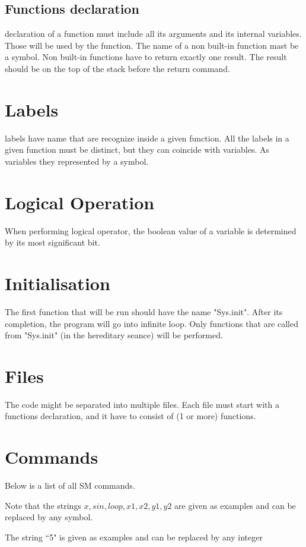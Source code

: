 \documentclass[12pt]{amsart}
\begin{document}
\subsection{Functions declaration}	
declaration of a function must include all its arguments and its internal variables. Those will be used by the function.
The name of a non built-in function mast be a symbol.
Non built-in functions have to return exactly one result. The result should be on the top of the stack before the return command.

\section{Labels}
labels have name that are recognize inside a given function. All the labels in a given function must be distinct, but they can coincide with variables. As variables they represented by a symbol.

\section{Logical Operation}

When performing logical operator, the boolean value of a variable is determined by its most significant bit.

\section{Initialisation}
The first function that will be run should have the name "Sys.init". After its completion, the program will go into infinite loop. Only functions that are called from "Sys.init" (in the hereditary seance) will be performed.

\section{Files}
The code might be separated into multiple files. Each file must start with a functions declaration, and it have to consist of (1 or more) functions. 
 
\section{Commands}
Below is a list of all SM commands. 

Note that the strings
$x,sin,loop, x1,x2,y1,y2 $
are given as examples and can be replaced by any symbol.

The string ``5" is given as examples and  can be replaced by any integer
\end{document}
